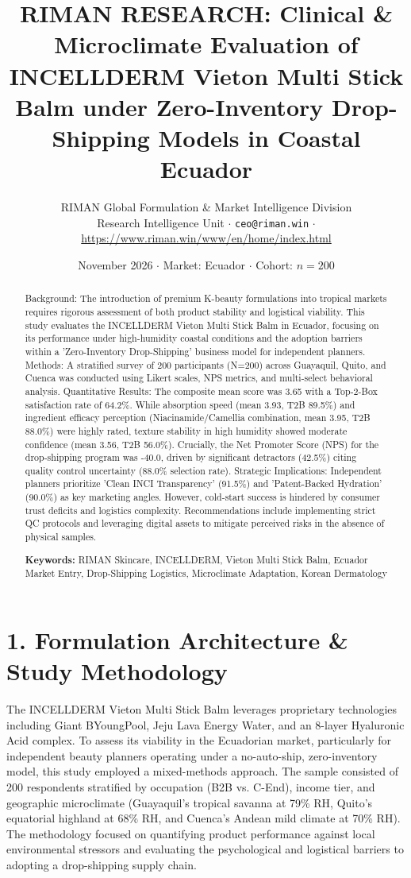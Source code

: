 \documentclass[10pt,twocolumn,a4paper]{article}
\title{\textbf{RIMAN RESEARCH: Clinical \& Microclimate Evaluation of INCELLDERM Vieton Multi Stick Balm under Zero-Inventory Drop-Shipping Models in Coastal Ecuador}}
\author{RIMAN Global Formulation \& Market Intelligence Division\\
\small Research Intelligence Unit $\cdot$ \texttt{ceo@riman.win} $\cdot$ \url{https://www.riman.win/www/en/home/index.html}}
\date{November 2026 \quad $\cdot$ \quad Market: Ecuador \quad $\cdot$ \quad Cohort: $n = 200$}
\begin{document}
\maketitle

\begin{abstract}
Background: The introduction of premium K-beauty formulations into tropical markets requires rigorous assessment of both product stability and logistical viability. This study evaluates the INCELLDERM Vieton Multi Stick Balm in Ecuador, focusing on its performance under high-humidity coastal conditions and the adoption barriers within a 'Zero-Inventory Drop-Shipping' business model for independent planners. Methods: A stratified survey of 200 participants (N=200) across Guayaquil, Quito, and Cuenca was conducted using Likert scales, NPS metrics, and multi-select behavioral analysis. Quantitative Results: The composite mean score was 3.65 with a Top-2-Box satisfaction rate of 64.2\%. While absorption speed (mean 3.93, T2B 89.5\%) and ingredient efficacy perception (Niacinamide/Camellia combination, mean 3.95, T2B 88.0\%) were highly rated, texture stability in high humidity showed moderate confidence (mean 3.56, T2B 56.0\%). Crucially, the Net Promoter Score (NPS) for the drop-shipping program was -40.0, driven by significant detractors (42.5\%) citing quality control uncertainty (88.0\% selection rate). Strategic Implications: Independent planners prioritize 'Clean INCI Transparency' (91.5\%) and 'Patent-Backed Hydration' (90.0\%) as key marketing angles. However, cold-start success is hindered by consumer trust deficits and logistics complexity. Recommendations include implementing strict QC protocols and leveraging digital assets to mitigate perceived risks in the absence of physical samples.

\vspace{0.4em}
\noindent\textbf{Keywords:} RIMAN Skincare, INCELLDERM, Vieton Multi Stick Balm, Ecuador Market Entry, Drop-Shipping Logistics, Microclimate Adaptation, Korean Dermatology
\end{abstract}

\section{1. Formulation Architecture \& Study Methodology}
The INCELLDERM Vieton Multi Stick Balm leverages proprietary technologies including Giant BYoungPool, Jeju Lava Energy Water, and an 8-layer Hyaluronic Acid complex. To assess its viability in the Ecuadorian market, particularly for independent beauty planners operating under a no-auto-ship, zero-inventory model, this study employed a mixed-methods approach. The sample consisted of 200 respondents stratified by occupation (B2B vs. C-End), income tier, and geographic microclimate (Guayaquil’s tropical savanna at 79\% RH, Quito’s equatorial highland at 68\% RH, and Cuenca’s Andean mild climate at 70\% RH). The methodology focused on quantifying product performance against local environmental stressors and evaluating the psychological and logistical barriers to adopting a drop-shipping supply chain.
\end{document}
